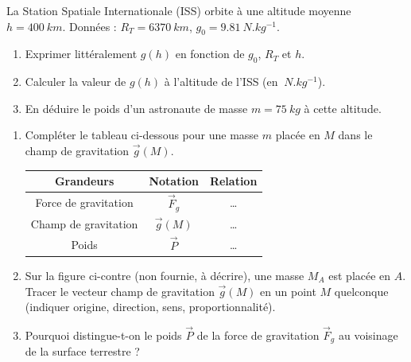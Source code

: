 \documentclass[11pt]{article}
\begin{document}
\begin{exercice}
La Station Spatiale Internationale (ISS) orbite à une altitude moyenne $h = \SI{400}{km}$.
Données : $R_T = \SI{6370}{km}$, $g_0 = \SI{9,81}{N.kg^{-1}}$.
\begin{enumerate}
    \item Exprimer littéralement $g(h)$ en fonction de $g_0$, $R_T$ et $h$.
    \item Calculer la valeur de $g(h)$ à l'altitude de l'ISS (en $\SI{}{N.kg^{-1}}$).
    \item En déduire le poids d'un astronaute de masse $m = \SI{75}{kg}$ à cette altitude.
\end{enumerate}
\end{exercice}

\begin{exercice}
\begin{enumerate}
    \item Compléter le tableau ci-dessous pour une masse $m$ placée en $M$ dans le champ de gravitation $\vec{g}(M)$.
    \begin{tabular}{|c|c|c|}
    \hline
    \textbf{Grandeurs} & \textbf{Notation} & \textbf{Relation} \\
    \hline
    Force de gravitation & $\vec{F}_g$ & \ldots \\
    \hline
    Champ de gravitation & $\vec{g}(M)$ & \ldots \\
    \hline
    Poids & $\vec{P}$ & \ldots \\
    \hline
    \end{tabular}
    \item Sur la figure ci-contre (non fournie, à décrire), une masse $M_A$ est placée en $A$. Tracer le vecteur champ de gravitation $\vec{g}(M)$ en un point $M$ quelconque (indiquer origine, direction, sens, proportionnalité).
    \item Pourquoi distingue-t-on le poids $\vec{P}$ de la force de gravitation $\vec{F}_g$ au voisinage de la surface terrestre ?
\end{enumerate}
\end{exercice}
\end{document}
